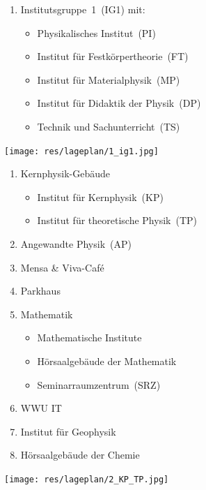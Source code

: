 {\large\RaggedRight
\begin{minipage}{0.54\textwidth}
	\begin{enumerate}[labelsep=*, leftmargin=1.2em, series=lageplan]
		\item Institutsgruppe~1~(IG1) mit:
		\begin{itemize}
			\item Physikalisches Institut~(PI)
			\item Institut für Festkörpertheorie~(FT)
			\item Institut für Materialphysik~(MP)
			\item Institut für Didaktik der Physik~(DP)
			\item Technik und Sachunterricht~(TS)
		\end{itemize}
	\end{enumerate}
\end{minipage}
\hfill
\begin{minipage}{0.45\textwidth}
	\centering
	\texttt{[image: res/lageplan/1\_ig1.jpg]}
\end{minipage}

\clearpage

\begin{minipage}{0.54\textwidth}
	\begin{enumerate}[resume*=lageplan]
		\item Kernphysik-Gebäude
		\begin{itemize}
			\item Institut für Kernphysik~(KP)
			\item Institut für theoretische Physik~(TP)
		\end{itemize}
		\item Angewandte Physik~(AP)
		\item Mensa \& Viva-Café
		\item Parkhaus
		\item Mathematik
		\begin{itemize}
			\item Mathematische Institute
			\item Hörsaalgebäude der Mathematik
			\item Seminarraumzentrum~(SRZ)
		\end{itemize}
		\item WWU IT
		\item Institut für Geophysik
		\item Hörsaalgebäude der Chemie
	\end{enumerate}
\end{minipage}
\hfill
\begin{minipage}{0.45\textwidth}
	\vspace{-0.5cm}
	\centering
	\texttt{[image: res/lageplan/2\_KP\_TP.jpg]}
\end{minipage}

}
